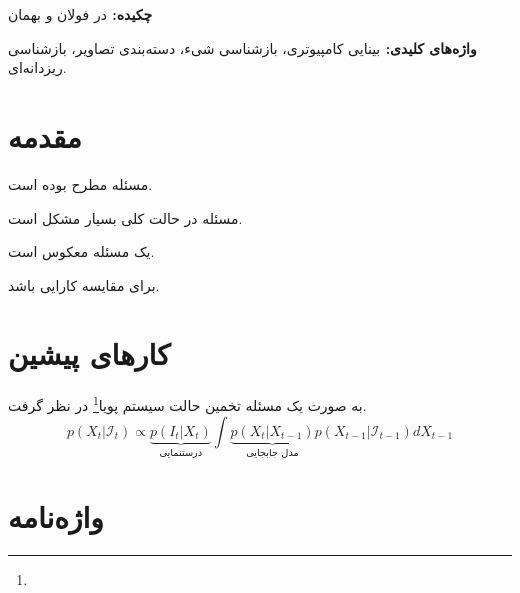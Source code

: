 \documentclass[11pt]{article}
\begin{document}



{\bf {چکيده: }}
در فولان و بهمان


{\bf  { واژه‌های کلیدی: }}
بینایی کامپیوتری، بازشناسی شیء، دسته‌بندی تصاویر، بازشناسی ریزدانه‌ای.

\setlength{\parindent}{0.25in} %

\section{مقدمه}\label{intro}


مسئله مطرح بوده است.

مسئله در حالت کلی بسیار مشکل است.


یک مسئله معکوس است. 

برای مقایسه کارایی باشد.


\section{کارهای پیشین}\label{sec2}
به صورت یک مسئله تخمین حالت  سیستم پویا\footnote{} در نظر گرفت.
\begin{equation}\label{equ:bayes}
p(X_t|\mathcal{I}_t) \propto  \underbrace{p(I_t|X_t)}_\text{درستنمایی}  \int{ \underbrace{p(X_t|X_{t-1})}_\text{مدل جابجایی} p(X_{t-1}|\mathcal{I}_{t-1}) dX_{t-1}}
\end{equation}

\linespread{1}
\small
\setlength{\parskip}{0pt}
\setlength{\parsep}{0pt}

\renewcommand{\bibname}{مراجع}
\begin{latin}

%

\end{latin}

%


\section*{واژه‌نامه}
\begin{multicols}{3}
\theendnotes 
\end{multicols}
\end{document}
